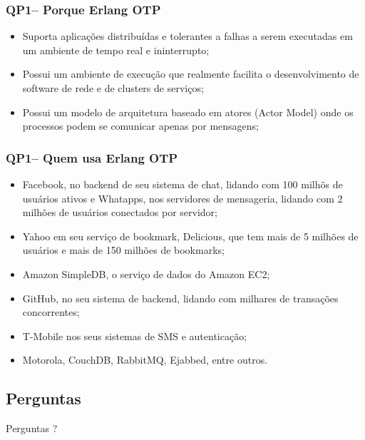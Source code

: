 \documentclass{beamer}
\begin{document}
\begin{frame}
  \frametitle{QP1-- Porque Erlang OTP}

    \begin{itemize}
       \item<1-> Suporta aplicações distribuídas e tolerantes a falhas a serem executadas em um ambiente de tempo real e ininterrupto;
       \item<1-> Possui um ambiente de execução que realmente facilita o desenvolvimento de software de rede e de clusters de serviços;
       
       \item<1-> Possui um modelo de arquitetura baseado em atores (Actor Model) onde os processos podem 
       se comunicar apenas por mensagens;
       
    \end{itemize}
  
\end{frame}


\begin{frame}
  \frametitle{QP1-- Quem usa Erlang OTP}

	  \begin{itemize}
		\item<1->Facebook, no backend de seu sistema de chat, lidando com 100 milhõs de usuários ativos e
		Whatapps, nos servidores de mensageria, lidando com 2 milhões de usuários conectados por servidor;
		\item<1->Yahoo em seu serviço de bookmark, Delicious, que tem mais de 5 milhões de usuários e mais de 150 milhões de bookmarks;
		\item<1->Amazon SimpleDB, o serviço de dados do Amazon EC2;
		\item<1->GitHub, no seu sistema de backend, lidando com milhares de transações concorrentes;
		\item<1->T-Mobile nos seus sistemas de SMS e autenticação;
		\item<1->Motorola, CouchDB, RabbitMQ, Ejabbed, entre outros.
						
	   \end{itemize}
  
\end{frame}










\subsection{Perguntas}


\begin{frame}[c]{ }
\centering
  \huge{Perguntas ?}
\end{frame}
\end{document}
